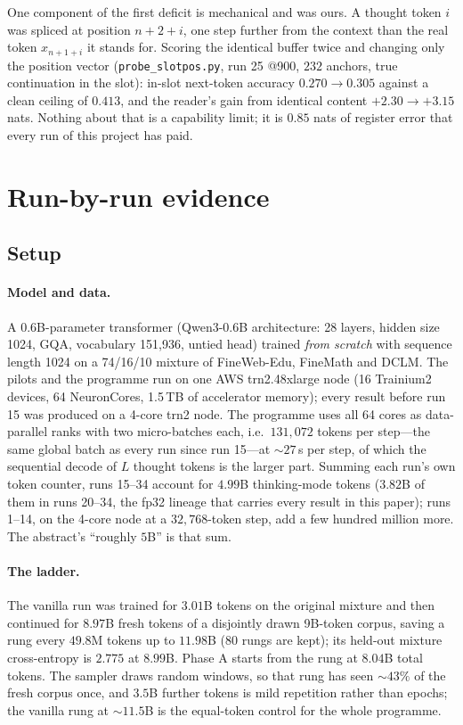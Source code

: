 \documentclass{article} %
\begin{document}
One component of the first deficit is mechanical and was ours. A thought token $i$ was spliced at position $n{+}2{+}i$, one step further from the context than the real token $x_{n+1+i}$ it stands for. Scoring the identical buffer twice and changing only the position vector (\texttt{probe\_slotpos.py}, run 25 @900, $232$ anchors, true continuation in the slot): in-slot next-token accuracy $0.270 \to 0.305$ against a clean ceiling of $0.413$, and the reader's gain from identical content $+2.30 \to +3.15$ nats. Nothing about that is a capability limit; it is $0.85$ nats of register error that every run of this project has paid.

\section{Run-by-run evidence}
\label{sec:experiments}

\subsection{Setup}
\label{sec:setup}

\paragraph{Model and data.} A 0.6B-parameter transformer (Qwen3-0.6B architecture: 28 layers, hidden size 1024, GQA, vocabulary 151{,}936, untied head) trained \emph{from scratch} with sequence length 1024 on a 74/16/10 mixture of FineWeb-Edu, FineMath and DCLM. The pilots and the programme run on one AWS trn2.48xlarge node (16 Trainium2 devices, 64 NeuronCores, 1.5\,TB of accelerator memory); every result before run 15 was produced on a 4-core trn2 node. The programme uses all 64 cores as data-parallel ranks with two micro-batches each, i.e.\ $131{,}072$ tokens per step---the same global batch as every run since run 15---at ${\sim}27$\,s per step, of which the sequential decode of $L$ thought tokens is the larger part. Summing each run's own token counter, runs 15--34 account for $4.99$B thinking-mode tokens ($3.82$B of them in runs 20--34, the fp32 lineage that carries every result in this paper); runs 1--14, on the 4-core node at a $32{,}768$-token step, add a few hundred million more. The abstract's ``roughly $5$B'' is that sum.

\paragraph{The ladder.} The vanilla run was trained for $3.01$B tokens on the original mixture and then continued for $8.97$B fresh tokens of a disjointly drawn 9B-token corpus, saving a rung every $49.8$M tokens up to $11.98$B (80 rungs are kept); its held-out mixture cross-entropy is $2.775$ at $8.99$B. Phase A starts from the rung at $8.04$B total tokens. The sampler draws random windows, so that rung has seen ${\sim}43\%$ of the fresh corpus once, and $3.5$B further tokens is mild repetition rather than epochs; the vanilla rung at ${\sim}11.5$B is the equal-token control for the whole programme.
\end{document}
